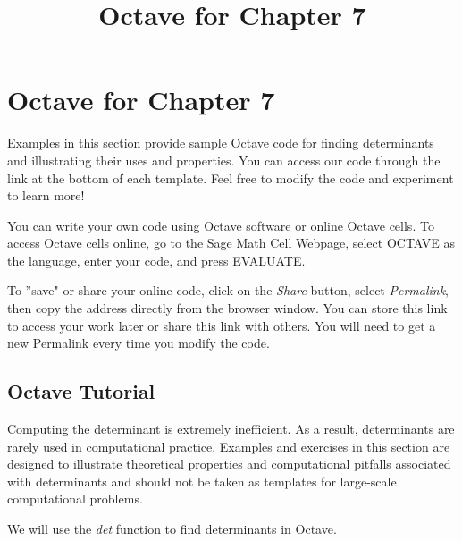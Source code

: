 \documentclass{ximera}
\title{Octave for Chapter 7} \license{CC BY-NC-SA 4.0}
\begin{document}
\begin{abstract}
\end{abstract}
\maketitle

\section*{Octave for Chapter 7}

Examples in this section provide sample Octave code for finding determinants and illustrating their uses and properties. You can access our code through the link at the bottom of each template.  Feel free to modify the code and experiment to learn more!  

You can write your own code using Octave software or online Octave cells.  To access Octave cells online, go to the \href{https://sagecell.sagemath.org/}{Sage Math Cell Webpage}, select OCTAVE as the language, enter your code, and press EVALUATE.  

To ''save" or share your online code, click on the \emph{Share} button, select \emph{Permalink}, then copy the address directly from the browser window.  You can store this link to access your work later or share this link with others.  You will need to get a new Permalink every time you modify the code.

\subsection*{Octave Tutorial}
\begin{warning}
Computing the determinant is extremely inefficient.  As a result, determinants are rarely used in computational practice.  Examples and exercises in this section are designed to illustrate theoretical properties and computational pitfalls associated with determinants and should not be taken as templates for large-scale computational problems.
\end{warning}

We will use the \emph{det} function to find determinants in Octave.
\end{document}
